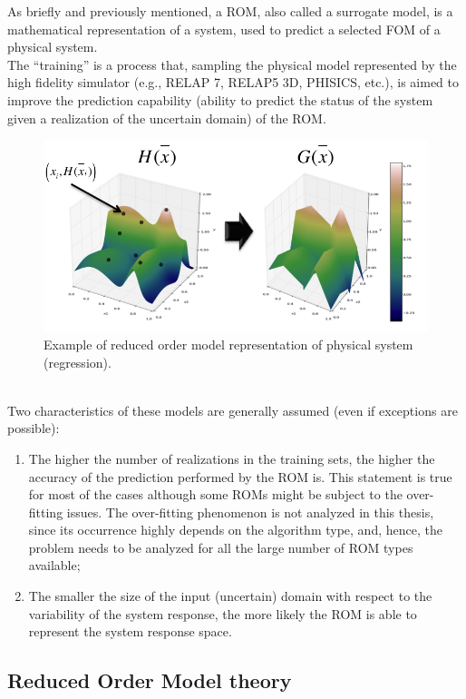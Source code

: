 As briefly and previously mentioned, a ROM, also called a surrogate 
model, is a mathematical representation of a system, used to predict 
a selected FOM of a physical system.
\\The ``training'' is a process that, sampling the physical model 
represented by the high fidelity simulator (e.g., RELAP 7, RELAP5 
3D, PHISICS, etc.), is aimed to improve the prediction capability 
(ability to predict the status of the system given a realization of the 
uncertain domain) of the ROM. 
\begin{figure}[h!]
  \centering
  \includegraphics[width=1.0\textwidth]  {pics/ROMexampleOfPhysicalSystem.png}
  \caption{Example of reduced order model representation of physical system (regression).}
  \label{fig:ROMexampleOfPhysicalSystem}
\end{figure}
\\Two characteristics of these models 
are generally assumed (even if exceptions are possible):
\begin{enumerate}
  \item The higher the number of realizations in the training sets, the 
higher the accuracy of the prediction performed by the ROM is. This 
statement is true for most of the cases although some ROMs might be 
subject to the over-fitting issues. The over-fitting phenomenon is not 
analyzed in this thesis, since its occurrence highly depends on the 
algorithm type, and, hence, the problem needs to be analyzed for all 
the large number of ROM types available;
  \item The smaller the size of the input (uncertain) domain with 
  respect to the variability of the system response, the more likely the 
  ROM is able to represent the system response space.
\end{enumerate}

\subsection{Reduced Order Model theory}

